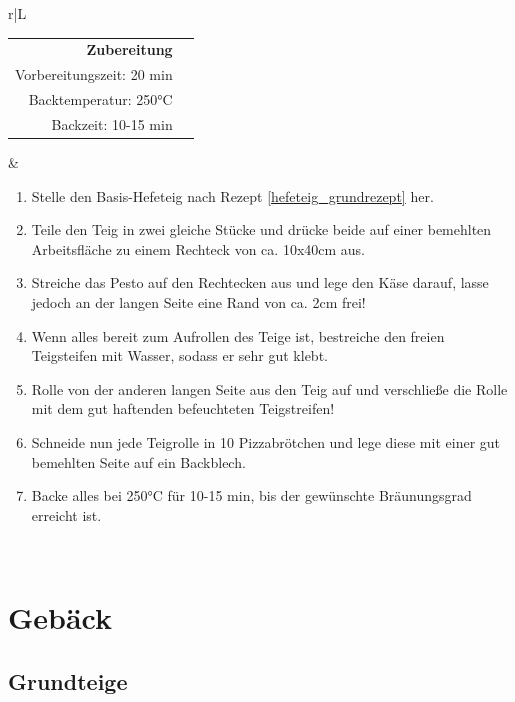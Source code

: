 \documentclass[a4paper, 12pt]{scrbook} 								%
\numberwithin{equation}{section} 									%
\begin{document}
	\newpage
	\begin{tabularx}{\textwidth}{r|L}

									
		\begin{tabular}[t]{rr}
			\textbf{Zubereitung}	\\
			Vorbereitungszeit: 20 min	\\
			Backtemperatur: 250°C	\\
			Backzeit: 10-15 min
		\end{tabular}			&	\begin{enumerate}[nosep]
										\item Stelle den Basis-Hefeteig nach Rezept \ref{hefeteig_grundrezept} her.
										\item Teile den Teig in zwei gleiche Stücke und drücke beide auf einer bemehlten Arbeitsfläche zu einem Rechteck von ca. 10x40cm aus.
										\item Streiche das Pesto auf den Rechtecken aus und lege den Käse darauf, lasse jedoch an der langen Seite eine Rand von ca. 2cm frei!
										\item Wenn alles bereit zum Aufrollen des Teige ist, bestreiche den freien Teigsteifen mit Wasser, sodass er sehr gut klebt.
										\item Rolle von der anderen langen Seite aus den Teig auf und verschließe die Rolle mit dem gut haftenden befeuchteten Teigstreifen!
										\item Schneide nun jede Teigrolle in 10 Pizzabrötchen und lege diese mit einer gut bemehlten Seite auf ein Backblech.
										\item Backe alles bei 250°C für 10-15 min, bis der gewünschte Bräunungsgrad erreicht ist.
									\end{enumerate}	\\
	\end{tabularx}
	\newpage


\chapter{Gebäck}
\newpage


	\section{Grundteige}
	\newpage
\end{document}
